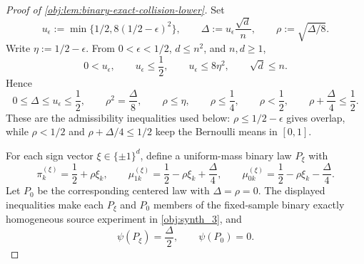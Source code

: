 \begin{proof}[Proof of \cref{obj:lem:binary-exact-collision-lower}]
Set
\[
u_\epsilon:=\min\{1/2,8(1/2-\epsilon)^2\},
\qquad
\Delta:=u_\epsilon\frac{\sqrt d}{n},
\qquad
\rho:=\sqrt{\Delta/8}.
\]
Write \(\eta:=1/2-\epsilon\).  From \(0<\epsilon<1/2\), \(d\le n^2\), and \(n,d\ge1\),
\[
0<u_\epsilon,
\qquad
u_\epsilon\le\frac12,
\qquad
u_\epsilon\le 8\eta^2,
\qquad
\sqrt d\le n.
\]
Hence
\[
0\le\Delta\le u_\epsilon\le\frac12,
\qquad
\rho^2=\frac{\Delta}{8},
\qquad
\rho\le\eta,
\qquad
\rho\le\frac14,
\qquad
\rho<\frac12,
\qquad
\rho+\frac{\Delta}{4}\le\frac12.
\]
These are the admissibility inequalities used below: \(\rho\le1/2-\epsilon\) gives overlap, while \(\rho<1/2\) and \(\rho+\Delta/4\le1/2\) keep the Bernoulli means in \([0,1]\). %

For each sign vector \(\xi\in\{\pm1\}^d\), define a uniform-mass binary law \(P_\xi\) with
\[
\pi_k^{(\xi)}=\frac12+\rho\xi_k,
\qquad
\mu_{1k}^{(\xi)}=\frac12-\rho\xi_k+\frac{\Delta}{4},
\qquad
\mu_{0k}^{(\xi)}=\frac12-\rho\xi_k-\frac{\Delta}{4}.
\]
Let \(P_0\) be the corresponding centered law with \(\Delta=\rho=0\).  The displayed inequalities make each \(P_\xi\) and \(P_0\) members of the fixed-sample binary exactly homogeneous source experiment in \cref{obj:synth_3}, and
\[
\psi(P_\xi)=\frac{\Delta}{2},
\qquad
\psi(P_0)=0.
\] %


\end{proof}
